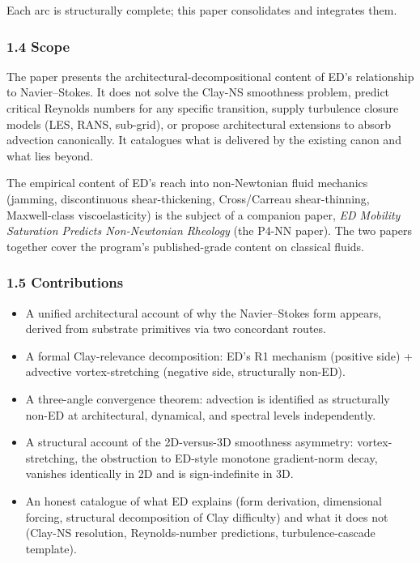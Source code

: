\documentclass[
]{article}
\providecommand{\tightlist}{%
  \setlength{\itemsep}{0pt}\setlength{\parskip}{0pt}}
\begin{document}
Each arc is structurally complete; this paper consolidates and
integrates them.

\subsubsection{1.4 Scope}\label{scope}

The paper presents the architectural-decompositional content of ED's
relationship to Navier--Stokes. It does not solve the Clay-NS smoothness
problem, predict critical Reynolds numbers for any specific transition,
supply turbulence closure models (LES, RANS, sub-grid), or propose
architectural extensions to absorb advection canonically. It catalogues
what is delivered by the existing canon and what lies beyond.

The empirical content of ED's reach into non-Newtonian fluid mechanics
(jamming, discontinuous shear-thickening, Cross/Carreau shear-thinning,
Maxwell-class viscoelasticity) is the subject of a companion paper,
\emph{ED Mobility Saturation Predicts Non-Newtonian Rheology} (the P4-NN
paper). The two papers together cover the program's published-grade
content on classical fluids.

\subsubsection{1.5 Contributions}\label{contributions}

\begin{itemize}
\tightlist
\item
  A unified architectural account of why the Navier--Stokes form
  appears, derived from substrate primitives via two concordant routes.
\item
  A formal Clay-relevance decomposition: ED's R1 mechanism (positive
  side) + advective vortex-stretching (negative side, structurally
  non-ED).
\item
  A three-angle convergence theorem: advection is identified as
  structurally non-ED at architectural, dynamical, and spectral levels
  independently.
\item
  A structural account of the 2D-versus-3D smoothness asymmetry:
  vortex-stretching, the obstruction to ED-style monotone gradient-norm
  decay, vanishes identically in 2D and is sign-indefinite in 3D.
\item
  An honest catalogue of what ED explains (form derivation, dimensional
  forcing, structural decomposition of Clay difficulty) and what it does
  not (Clay-NS resolution, Reynolds-number predictions,
  turbulence-cascade template).
\end{itemize}
\end{document}
